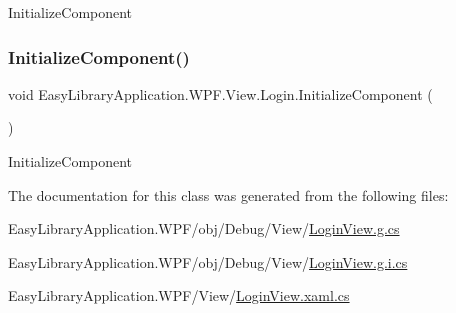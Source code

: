 Initialize\+Component 

\mbox{\label{class_easy_library_application_1_1_w_p_f_1_1_view_1_1_login_ad9e46d81378fcd9a2dcc78b38d86896e}} 
\subsubsection{\texorpdfstring{Initialize\+Component()}{InitializeComponent()}\hspace{0.1cm}{\footnotesize\ttfamily [2/2]}}
{\footnotesize\ttfamily void Easy\+Library\+Application.\+W\+P\+F.\+View.\+Login.\+Initialize\+Component (\begin{DoxyParamCaption}{ }\end{DoxyParamCaption})}



Initialize\+Component 



The documentation for this class was generated from the following files\+:\begin{DoxyCompactItemize}
\item 
Easy\+Library\+Application.\+W\+P\+F/obj/\+Debug/\+View/\mbox{\hyperlink{_login_view_8g_8cs}{Login\+View.\+g.\+cs}}\item 
Easy\+Library\+Application.\+W\+P\+F/obj/\+Debug/\+View/\mbox{\hyperlink{_login_view_8g_8i_8cs}{Login\+View.\+g.\+i.\+cs}}\item 
Easy\+Library\+Application.\+W\+P\+F/\+View/\mbox{\hyperlink{_login_view_8xaml_8cs}{Login\+View.\+xaml.\+cs}}\end{DoxyCompactItemize}
